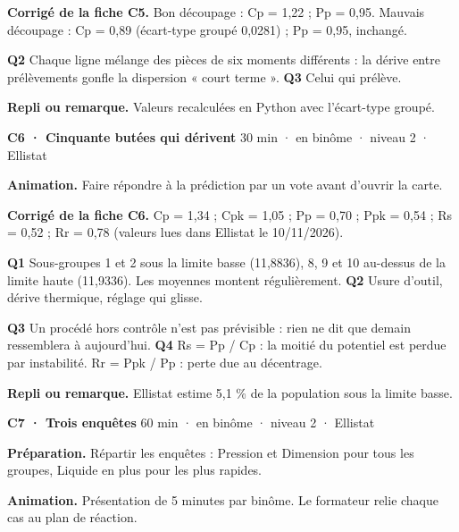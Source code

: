 \textbf{\color{ok}Corrigé de la fiche C5.} Bon découpage : Cp = 1,22 ; Pp = 0,95. Mauvais découpage : Cp = 0,89 (écart-type groupé 0,0281) ; Pp = 0,95, inchangé.\par \textbf{Q2} Chaque ligne mélange des pièces de six moments différents : la dérive entre prélèvements gonfle la dispersion « court terme ». \textbf{Q3} Celui qui prélève.\par
{\small\textbf{Repli ou remarque.} Valeurs recalculées en Python avec l'écart-type groupé.}\par
\vspace{3pt}
\begin{tcolorbox}[act]\textbf{C6 · Cinquante butées qui dérivent} \hfill {\small 30 min · en binôme · niveau 2 · Ellistat}\end{tcolorbox}
\textbf{Animation.} Faire répondre à la prédiction par un vote avant d'ouvrir la carte.\par
\textbf{\color{ok}Corrigé de la fiche C6.} Cp = 1,34 ; Cpk = 1,05 ; Pp = 0,70 ; Ppk = 0,54 ; Rs = 0,52 ; Rr = 0,78 (valeurs lues dans Ellistat le 10/11/2026).\par \textbf{Q1} Sous-groupes 1 et 2 sous la limite basse (11,8836), 8, 9 et 10 au-dessus de la limite haute (11,9336). Les moyennes montent régulièrement. \textbf{Q2} Usure d'outil, dérive thermique, réglage qui glisse.\par \textbf{Q3} Un procédé hors contrôle n'est pas prévisible : rien ne dit que demain ressemblera à aujourd'hui. \textbf{Q4} Rs = Pp / Cp : la moitié du potentiel est perdue par instabilité. Rr = Ppk / Pp : perte due au décentrage.\par
{\small\textbf{Repli ou remarque.} Ellistat estime 5,1 \% de la population sous la limite basse.}\par
\vspace{3pt}
\begin{tcolorbox}[act]\textbf{C7 · Trois enquêtes} \hfill {\small 60 min · en binôme · niveau 2 · Ellistat}\end{tcolorbox}
\textbf{Préparation.} Répartir les enquêtes : Pression et Dimension pour tous les groupes, Liquide en plus pour les plus rapides.\par
\textbf{Animation.} Présentation de 5 minutes par binôme. Le formateur relie chaque cas au plan de réaction.\par
